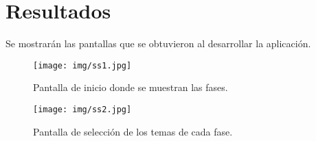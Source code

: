 \chapter{Resultados}

Se mostrarán las pantallas que se obtuvieron al desarrollar la aplicación.

\begin{figure}[H]
	\begin{center}
		\texttt{[image: img/ss1.jpg]} 
		\caption{Pantalla de inicio donde se muestran las fases.}
		\label{fases}
	\end{center}
\end{figure}

\begin{figure}[H]
	\begin{center}
		\texttt{[image: img/ss2.jpg]} 
		\caption{Pantalla de selección de los temas de cada fase.}
		\label{temas}
	\end{center}
\end{figure}